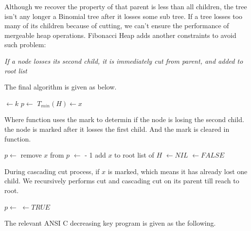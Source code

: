 \documentclass{article}
\begin{document}
Although we recover the property of that parent is less than all children,
the tree isn't any longer a Binomial tree after it losses some sub tree.
If a tree losses too many of its children because of cutting, we can't ensure
the performance of mergeable heap operations. Fibonacci Heap adds another
constraints to avoid such problem:

{\em If a node losses its second child, it is immediately cut from parent,
and added to root list}

The final  algorithm is given as below.

\begin{algorithmic}
  \State {} $\gets k$
  \State $p \gets $ 
    \State {}
    \State {}
  \EndIf
    \State $T_{min}(H) \gets x$
  \EndIf
\EndFunction
\end{algorithmic}

Where function  uses the mark to determin 
if the node is losing the second child. the node is marked after
it losses the first child. And the mark is cleared in  
function.

\begin{algorithmic}
  \State $p \gets $ 
  \State remove $x$ from $p$
  \State {} $\gets$  - 1
  \State add $x$ to root list of $H$
  \State {} $\gets NIL$
  \State {} $\gets FALSE$
\EndFunction
\end{algorithmic}

During cascading cut process, if $x$ is marked, which means it has
already lost one child. We recursively performs cut and cascading cut
on its parent till reach to root.

\begin{algorithmic}
  \State $p \gets $ 
      \State {} $\gets TRUE$
    \Else
      \State {}
      \State {}
    \EndIf
  \EndIf
\EndFunction
\end{algorithmic}

The relevant ANSI C decreasing key program is given as the following.
\end{document}
